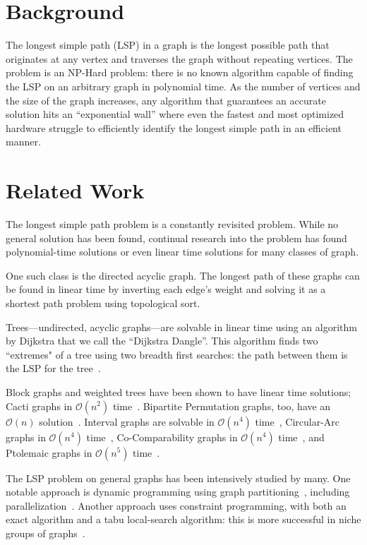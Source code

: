 \documentclass[twocolumn,showpacs,%
  nofootinbib,aps,superscriptaddress,%
  eqsecnum,prd,notitlepage,showkeys,11pt]{article}
\begin{document}
\section{Background}

The longest simple path (LSP) in a graph is the longest possible path that originates at any vertex and traverses the graph without repeating vertices. The problem is an NP-Hard problem: there is no known algorithm capable of finding the LSP on an arbitrary graph in polynomial time. As the number of vertices and the size of the graph increases, any algorithm that guarantees an accurate solution hits an ``exponential wall'' where even the fastest and most optimized hardware struggle to efficiently identify the longest simple path in an efficient manner.

\section{Related Work} 
The longest simple path problem is a constantly revisited problem. While no general solution has been found, continual research into the problem has found polynomial-time solutions or even linear time solutions for many classes of graph.

One such class is the directed acyclic graph. The longest path of these graphs can be found in linear time by inverting each edge's weight and solving it as a shortest path problem using topological sort.~\cite{?}

Trees---undirected, acyclic graphs---are solvable in linear time using an algorithm by Dijkstra that we call the ``Dijkstra Dangle''. This algorithm finds two ``extremes" of a tree using two breadth first searches: the path between them is the LSP for the tree~\cite{club2002computing}.

Block graphs and weighted trees have been shown to have linear time solutions; Cacti graphs in $\mathcal{O}(n^2)$ time~\cite{uehara2004efficient, uehara2007computing}. Bipartite Permutation graphs, too, have an $\mathcal{O}(n)$ solution~\cite{uehara2007linear}. Interval graphs are solvable in $\mathcal{O}(n^4)$ time~\cite{ioannidou2009longest,  giannopoulou2015polynomial}, Circular-Arc graphs in $\mathcal{O}(n^4)$ time~\cite{mertzios2011computing}, Co-Comparability graphs in $\mathcal{O}(n^4)$ time~\cite{mertzios2012simple}, and Ptolemaic graphs in $\mathcal{O}(n^5)$ time~\cite{takahara2008longest}.

The LSP problem on general graphs has been intensively studied by many. One notable approach is dynamic programming using graph partitioning~\cite{balyo2017optimal}, including parallelization~\cite{fieger2019finding}. Another approach uses constraint programming, with both an exact algorithm and a tabu local-search algorithm: this is more successful in niche groups of graphs~\cite{pham2012solving}.
\end{document}
